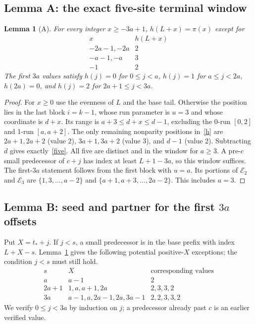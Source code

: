 \documentclass[10pt,a4paper]{article}
\newcommand{\E}{\mathcal E}
\newcommand{\p}{\pi}
\newtheorem{lemma}{Lemma}
\begin{document}
\subsection{Lemma A: the exact five-site terminal window}
\begin{lemma}[A]\label{A}
For every integer $x\ge-3a+1$, $h(L+x)=\p(x)$ except for
\begin{equation}\label{five}
\begin{array}{c|c}
 x&h(L+x)\\\hline
 -2a-1,-2a&2\\
 -a-1,-a&3\\
 -1&2
\end{array}
\end{equation}
The first $3a$ values satisfy $h(j)=0$ for $0\le j<a$, $h(j)=1$ for $a\le j<2a$, $h(2a)=0$, and $h(j)=2$ for $2a+1\le j<3a$.
\end{lemma}
\begin{proof}
For $x\ge0$ use the evenness of $L$ and the base tail. Otherwise the position lies in the last block $i=k-1$, whose run parameter is $u=3$ and whose coordinate is $d+x$. Its range is $a+3\le d+x\le d-1$, excluding the 0-run $[0,2]$ and 1-run $[a,a+2]$. The only remaining nonparity positions in~\eqref{h} are $2a+1,2a+2$ (value 2), $3a+1,3a+2$ (value 3), and $d-1$ (value 2). Subtracting $d$ gives exactly~\eqref{five}. All five are distinct and in the window for $a\ge3$. A pre-$c$ small predecessor of $c+j$ has index at least $L+1-3a$, so this window suffices. The first-$3a$ statement follows from the first block with $u=a$. Its portions of $\E_2$ and $\E_3$ are $\{1,3,\ldots,a-2\}$ and $\{a+1,a+3,\ldots,2a-2\}$. This includes $a=3$.
\end{proof}

\subsection{Lemma B: seed and partner for the first \texorpdfstring{$3a$}{3a} offsets}
Put $X=t_*+j$. If $j<s$, a small predecessor is in the base prefix with index $L+X-s$. Lemma~\ref{A} gives the following potential positive-$X$ exceptions; the condition $j<s$ must still hold.
\begin{equation}\label{seedexceptions}
\begin{array}{c|l|l}
 s&X&\text{corresponding values}\\\hline
 a&a-1&2\\
 2a+1&1,a,a+1,2a&2,3,3,2\\
 3a&a-1,a,2a-1,2a,3a-1&2,2,3,3,2
\end{array}
\end{equation}
We verify $0\le j<3a$ by induction on $j$; a predecessor already past $c$ is an earlier verified value.
\end{document}
